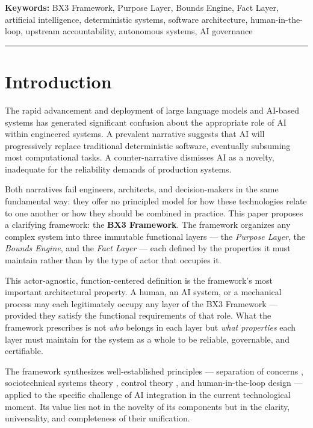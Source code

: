 \documentclass[12pt]{article}
\begin{document}
\vspace{0.5em}
\noindent\textbf{Keywords:} BX3 Framework, Purpose Layer, Bounds Engine, Fact Layer, artificial intelligence, deterministic systems, software architecture, human-in-the-loop, upstream accountability, autonomous systems, AI governance

\vspace{1em}\hrule\vspace{1em}
\onehalfspacing

\section{Introduction}
\label{sec:intro}

The rapid advancement and deployment of large language models and AI-based systems has generated significant confusion about the appropriate role of AI within engineered systems. A prevalent narrative suggests that AI will progressively replace traditional deterministic software, eventually subsuming most computational tasks. A counter-narrative dismisses AI as a novelty, inadequate for the reliability demands of production systems.

Both narratives fail engineers, architects, and decision-makers in the same fundamental way: they offer no principled model for how these technologies relate to one another or how they should be combined in practice. This paper proposes a clarifying framework: the \textbf{BX3 Framework}. The framework organizes any complex system into three immutable functional layers --- the \textit{Purpose Layer}, the \textit{Bounds Engine}, and the \textit{Fact Layer} --- each defined by the properties it must maintain rather than by the type of actor that occupies it.

This actor-agnostic, function-centered definition is the framework's most important architectural property. A human, an AI system, or a mechanical process may each legitimately occupy any layer of the BX3 Framework --- provided they satisfy the functional requirements of that role. What the framework prescribes is not \textit{who} belongs in each layer but \textit{what properties} each layer must maintain for the system as a whole to be reliable, governable, and certifiable.

The framework synthesizes well-established principles --- separation of concerns \cite{dijkstra1982}, sociotechnical systems theory \cite{trist1981}, control theory \cite{wiener1948}, and human-in-the-loop design \cite{bansal2019} --- applied to the specific challenge of AI integration in the current technological moment. Its value lies not in the novelty of its components but in the clarity, universality, and completeness of their unification.
\end{document}

